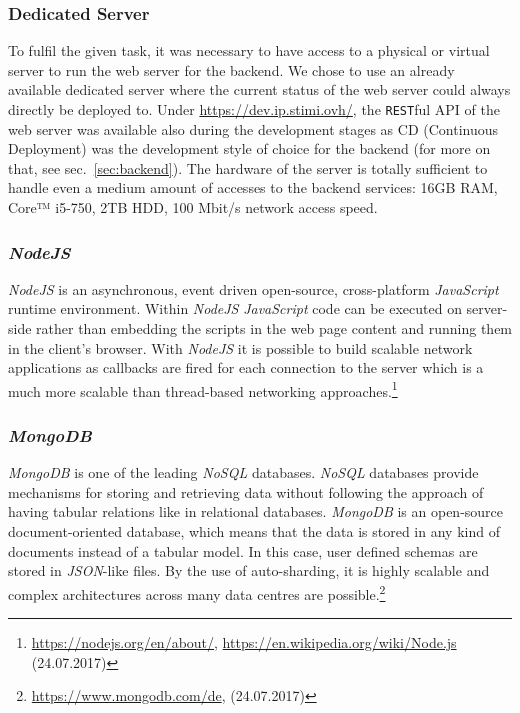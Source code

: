\subsubsection{Dedicated Server}
\label{subsubsec:dedicatedserver}
To fulfil the given task, it was necessary to have access to a physical or virtual server to run the web server for the backend. We chose to use an already available dedicated server where the current status of the web server could always directly be deployed to. Under \url{https://dev.ip.stimi.ovh/}, the \texttt{REST}ful API of the web server was available also during the development stages as CD (Continuous Deployment) was the development style of choice for the backend (for more on that, see sec.\ \ref{sec:backend}). \newline
The hardware of the server is totally sufficient to handle even a medium amount of accesses to the backend services: 16GB RAM, Core™ i5-750, 2TB HDD, 100 Mbit/s network access speed.

\subsubsection{\textit{NodeJS}}
\label{subsubsec:nodejs}
\textit{NodeJS} is an asynchronous, event driven open-source, cross-platform \textit{JavaScript} runtime environment. Within \textit{NodeJS} \textit{JavaScript} code can be executed on server-side rather than embedding the scripts in the web page content and running them in the client's browser. With \textit{NodeJS} it is possible to build scalable network applications as callbacks are fired for each connection to the server which is a much more scalable than thread-based networking approaches.\footnote{\url{https://nodejs.org/en/about/}, \url{https://en.wikipedia.org/wiki/Node.js} (24.07.2017)}

\subsubsection{\textit{MongoDB}}
\label{subsubsec:mongodb}
\textit{MongoDB} is one of the leading \textit{NoSQL} databases. \textit{NoSQL} databases provide mechanisms for storing and retrieving data without following the approach of having tabular relations like in relational databases. \textit{MongoDB} is an open-source document-oriented database, which means that the data is stored in any kind of documents instead of a tabular model. In this case, user defined schemas are stored in \textit{JSON}-like files. By the use of auto-sharding, it is highly scalable and complex architectures across many data centres are possible.\footnote{\url{https://www.mongodb.com/de}, (24.07.2017)}

